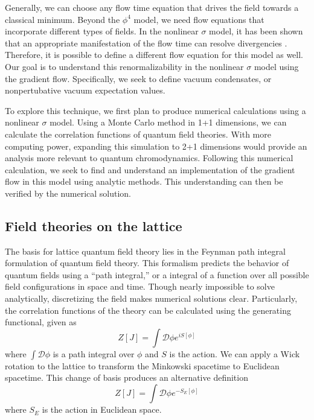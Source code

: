 \documentclass[12pt]{article}
\begin{document}
Generally, we can choose any flow time equation that drives the field towards a classical minimum. Beyond the $\phi^4$ model, we need flow equations that incorporate different types of fields. In the nonlinear $\sigma$ model, it has been shown that an appropriate manifestation of the flow time can resolve divergencies \cite{makino2015a}. Therefore, it is possible to define a different flow equation for this model as well. Our goal is to understand this renormalizability in the nonlinear $\sigma$ model using the gradient flow. Specifically, we seek to define vacuum condensates, or nonpertubative vacuum expectation values.

To explore this technique, we first plan to produce numerical calculations using a nonlinear $\sigma$ model. Using a Monte Carlo method in 1+1 dimensions, we can calculate the correlation functions of quantum field theories. With more computing power, expanding this simulation to 2+1 dimensions would provide an analysis more relevant to quantum chromodynamics.  Following this numerical calculation, we seek to find and understand an implementation of the gradient flow in this model using analytic methods. This understanding can then be verified by the numerical solution. 

\subsection{Field theories on the lattice}

The basis for lattice quantum field theory lies in the Feynman path integral formulation of quantum field theory. This formalism predicts the behavior of quantum fields using a ``path integral,'' or a integral of a function over all possible field configurations in space and time. Though nearly impossible to solve analytically, discretizing the field makes numerical solutions clear. Particularly, the correlation functions of the theory can be calculated using the generating functional, given as 
\begin{equation}
    Z[J] = \int \mathcal{D} \phi e^{iS[\phi]}
\end{equation}
where $\int \mathcal{D} \phi$ is a path integral over $\phi$ and $S$ is the action. We can apply a Wick rotation to the lattice to transform the Minkowski spacetime to Euclidean spacetime. This change of basis produces an alternative definition 
\begin{equation}
    Z[J] = \int \mathcal{D}\phi e^{-S_E[\phi]}
\end{equation}
where $S_E$ is the action in Euclidean space.
\end{document}
